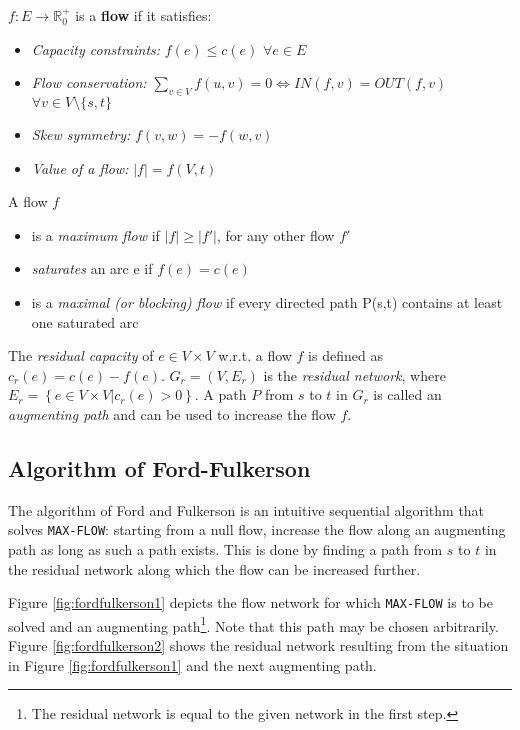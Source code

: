 \documentclass[a4paper,10pt, twocolumn]{article}
\begin{document}
\medskip
$f:E \rightarrow \mathbb{R}_0^{+}$ is a \textbf{flow} if it satisfies:
\begin{itemize}
	\item \emph{Capacity constraints:} $f(e) \leq c(e)$ $\forall e \in E$
	\item \emph{Flow conservation:} 
	$ \sum\limits_{v \in V} f(u,v) =  0 \Leftrightarrow IN(f,v) = OUT(f,v)$ $\forall v \in V \setminus \{s,t\}$
	\item \emph{Skew symmetry:} $f(v,w) = -f(w,v)$
	\item \emph{Value of a flow:} $\lvert f\rvert = f(V,t)$ 
\end{itemize}

A flow $f$
\begin{itemize}
	\item is a \emph{maximum flow} if $\lvert f\rvert \geq \lvert f'\rvert$, for any other flow $f'$
	\item \emph{saturates} an arc e if $f(e) = c(e)$
	\item is a \emph{maximal (or blocking) flow} if every directed path P(s,t) contains at least one saturated arc
\end{itemize}
\medskip
The \emph{residual capacity} of $e \in V \times V$ w.r.t. a flow $f$ is defined as $c_r(e) = c(e) - f(e)$. $G_r = (V, E_r)$ is the \emph{residual network}, where $E_r = \left\{e \in V \times V \lvert c_r(e) > 0\right\}$. A path $P$ from $s$ to $t$ in $G_r$ is called an \emph{augmenting path} and can be used to increase the flow $f$.

\subsection{Algorithm of Ford-Fulkerson}
\label{sec:fordfulkerson}
The algorithm of Ford and Fulkerson \cite{ahuja93} is an intuitive sequential algorithm that solves \lstinline|MAX-FLOW|: starting from a null flow, increase the flow along an augmenting path as long as such a path exists. This is done by finding a path from $s$ to $t$ in the residual network along which the flow can be increased further. 

Figure \ref{fig:fordfulkerson1} depicts the flow network for which \lstinline|MAX-FLOW| is to be solved and an augmenting path\footnote{The residual network is equal to the given network in the first step.}. Note that this path may be chosen arbitrarily. Figure \ref{fig:fordfulkerson2} shows the residual network resulting from the situation in Figure \ref{fig:fordfulkerson1} and the next augmenting path. 
\end{document}
